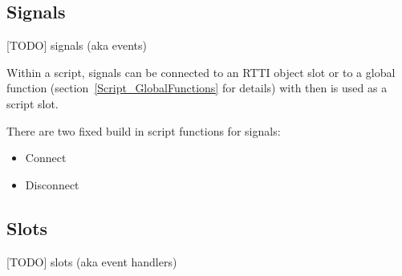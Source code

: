 \subsection{Signals}
\label{Script_RTTIObjects_Signals}
[TODO]
signals (aka events)

Within a script, signals can be connected to an RTTI object slot or to a global function (section~\ref{Script_GlobalFunctions} for details) with then is used as a script slot.

There are two fixed build in script functions for signals:
\begin{itemize}
\item{Connect}
\item{Disconnect}
\end{itemize}




\subsection{Slots}
\label{Script_RTTIObjects_Slots}
[TODO]
slots (aka event handlers)